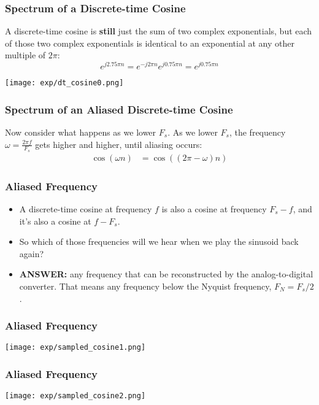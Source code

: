 \documentclass{beamer}
\begin{document}
\begin{frame}
  \frametitle{Spectrum of a Discrete-time Cosine}

  A discrete-time cosine is {\bf still} just the sum of two complex
  exponentials, but each of those two complex exponentials is
  identical to an exponential at any other multiple of $2\pi$:
  \begin{displaymath}
    e^{j2.75\pi n}=e^{-j2\pi n}e^{j0.75\pi n}=e^{j0.75\pi n}
  \end{displaymath}
  \centerline{\texttt{[image: exp/dt\_cosine0.png]}}
\end{frame}

\begin{frame}
  \frametitle{Spectrum of an Aliased Discrete-time Cosine}

  Now consider what happens as we lower $F_s$.  As we lower $F_s$, the
  frequency $\omega=\frac{2\pi f}{F_s}$ gets higher and higher, until
  aliasing occurs:
  \begin{align*}
    \cos\left(\omega n\right) &= \cos\left((2\pi-\omega)n\right)
  \end{align*}
    \centerline{}
\end{frame}

\begin{frame}
  \frametitle{Aliased Frequency}

  \begin{itemize}
    \item A discrete-time cosine at frequency $f$ is also a cosine at
      frequency $F_s-f$, and it's also a cosine at $f-F_s$.
    \item So which of those frequencies will we hear when we play
      the sinusoid back again?
    \item {\bf ANSWER:} any frequency that can be reconstructed by the
      analog-to-digital converter.  That means any frequency below the
      Nyquist frequency, $F_N=F_s/2$.
  \end{itemize}
  
\end{frame}

\begin{frame}
  \frametitle{Aliased Frequency}
  \centerline{\texttt{[image: exp/sampled\_cosine1.png]}}
\end{frame}
\begin{frame}
  \frametitle{Aliased Frequency}
  \centerline{\texttt{[image: exp/sampled\_cosine2.png]}}
\end{frame}
\end{document}

